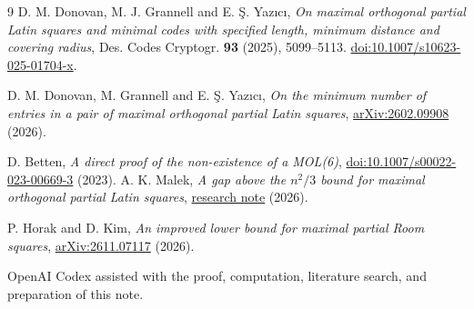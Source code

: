 \documentclass[11pt]{article}
\begin{document}
\begin{thebibliography}{9}
 D. M. Donovan, M. J. Grannell and E. \c{S}. Yaz\i c\i,
\emph{On maximal orthogonal partial Latin squares and minimal codes with
specified length, minimum distance and covering radius},
Des. Codes Cryptogr. \textbf{93} (2025), 5099--5113.
\href{https://doi.org/10.1007/s10623-025-01704-x}{doi:10.1007/s10623-025-01704-x}.

 D. M. Donovan, M. Grannell and E. \c{S}. Yaz\i c\i,
\emph{On the minimum number of entries in a pair of maximal orthogonal
partial Latin squares}, \href{https://arxiv.org/abs/2602.09908}{arXiv:2602.09908} (2026).

 D. Betten,
\emph{A direct proof of the non-existence of a MOL(6)},
\href{https://doi.org/10.1007/s00022-023-00669-3}{doi:10.1007/s00022-023-00669-3} (2023).
 A. K. Malek,
\emph{A gap above the \(n^2/3\) bound for maximal orthogonal partial Latin squares},
\href{https://github.com/Aafimalek/novel-discoveries/tree/main/orthogonal-latin-square-gap}{research note} (2026).

 P. Horak and D. Kim,
\emph{An improved lower bound for maximal partial Room squares},
\href{https://arxiv.org/abs/2611.07117}{arXiv:2611.07117} (2026).
\end{thebibliography}

\noindent\small OpenAI Codex assisted with the proof, computation,
literature search, and preparation of this note.
\end{document}
